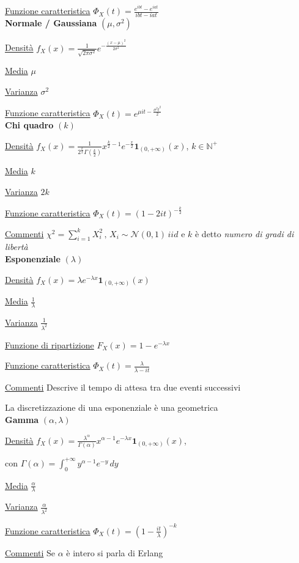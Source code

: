 \documentclass[openany]{book} %
\begin{document}
\begin{multicols}{2}
\underline{Funzione caratteristica} $\Phi_X(t)=\frac{e^{ibt}-e^{iat}}{ibt-iat}$
\\

\textbf{Normale / Gaussiana} $(\mu,\sigma^2)$

\underline{Densità} $f_X(x) = \frac{1}{\sqrt{2\pi\sigma^2}}e^{-\frac{(x-\mu)^2}{2\sigma^2}}$

\underline{Media} $\mu$

\underline{Varianza} $\sigma^2$

\underline{Funzione caratteristica} $\Phi_X(t)=e^{\mu it-\frac{\sigma^2t^2}{2}}$
\\

\textbf{Chi quadro} $(k)$

\underline{Densità} $f_X(x) = \frac{1}{2^{\frac{k}{2}}\Gamma(\frac{k}{2})}x^{\frac{k}{2}-1}e^{-\frac{x}{2}}\boldsymbol{1}_{(0,+\infty)}(x)$, $k\in \mathbb{N}^+$

\underline{Media} $k$

\underline{Varianza} $2k$

\underline{Funzione caratteristica} $\Phi_X(t)= (1-2it)^{-\frac{k}{2}}$

\underline{Commenti} $\chi^2=\sum_{i=1}^k X_i^2\,,\,X_i\sim \mathcal{N}(0,1)\,iid$  e $k$ è detto \textit{numero di gradi di libertà}
\\

\textbf{Esponenziale} $(\lambda)$

\underline{Densità} $f_X(x) = \lambda e^{-\lambda x}\boldsymbol{1}_{(0,+\infty)}(x)$

\underline{Media} $\frac{1}{\lambda}$

\underline{Varianza} $\frac{1}{\lambda^2}$

\underline{Funzione di ripartizione} $F_X(x)=1-e^{-\lambda x}$

\underline{Funzione caratteristica} $\Phi_X(t)=\frac{\lambda}{\lambda-it}$

\underline{Commenti} Descrive il tempo di attesa tra due eventi successivi

La discretizzazione di una esponenziale è una geometrica
\\

\textbf{Gamma} $(\alpha, \lambda)$

\underline{Densità} $f_X(x) = \frac{\lambda^\alpha}{\Gamma(\alpha)}x^{\alpha-1}e^{-\lambda x}\boldsymbol{1}_{(0,+\infty)}(x)$,

con $\Gamma(\alpha)=\int_0^{+\infty} y^{\alpha-1}e^{-y}\,dy$

\underline{Media} $\frac{\alpha}{\lambda}$

\underline{Varianza} $\frac{\alpha}{\lambda^2}$

\underline{Funzione caratteristica} $\Phi_X(t)=\left(1-\frac{it}{\lambda}\right)^{-k}$

\underline{Commenti} Se $\alpha$ è intero si parla di Erlang

\end{multicols}
\end{document}
